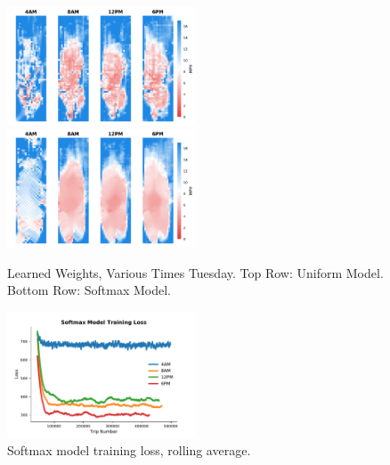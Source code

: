 \documentclass{article}
\begin{document}

\begin{figure}[h]
\centering
\includegraphics[width=0.5\textwidth]{figs/unifmaps.pdf}
\includegraphics[width=0.5\textwidth]{figs/softmaxmaps.pdf}
\caption{Learned Weights, Various Times Tuesday. Top Row: Uniform Model.
Bottom Row: Softmax Model.}
\label{fig:unifmap}
\end{figure}

\begin{figure}[h]
\centering
\includegraphics[width=0.5\textwidth]{figs/softmaxloss}
\caption{Softmax model training loss, rolling average.}
\label{fig:softmaxloss}
\end{figure}
\end{document}

